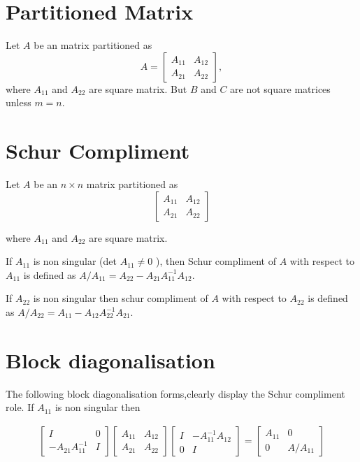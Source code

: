 
\section{Partitioned Matrix}
\begin{definition}
Let $A$ be an  matrix partitioned as 
$$ A = 
 \begin{bmatrix}
 A_{11} & A_{12}\\
 A_{21} & A_{22}
 \end{bmatrix},$$
where $A_{11}$ and $A_{22} $ are square matrix. But $B$ and $C$ are not square matrices unless $m =n$.
\end{definition}


\section{Schur Compliment}
Let $A$ be an $n\times n$ matrix partitioned as  
\[
 \begin{bmatrix}
 A_{11} & A_{12}\\
 A_{21} & A_{22}
 \end{bmatrix}
\]

where $A_{11}$ and $A_{22} $ are square matrix. 

If $A_{11}$ is non singular (det $A_{11}\neq 0 $ ), then Schur compliment of $A$ with respect to $A_{11}$
is defined as $A / A_{11} =  A_{22}-A_{21}A^{-1}_{11}A_{12}$.


If $A_{22}$ is non singular then schur compliment of $A$ with respect to
$A_{22}$ is defined as $ A / A_{22} =  A_{11}-A_{12}A^{-1}_{22}A_{21}$.\\


\section{Block diagonalisation}
The following block diagonalisation forms,clearly display the Schur compliment  role.
If $A_{11}$ is non singular then

\begin{eqnarray}
\begin{bmatrix}I&0\\-A_{21}A_{11}^{-1}&I\end{bmatrix}
\begin{bmatrix}A_{11}&A_{12}\\ A_{21}&A_{22}\end{bmatrix} 
\begin{bmatrix}I&-A_{11}^{-1}A_{12}\\0&I\end{bmatrix}
=
\begin{bmatrix}A_{11}&0\\0&A/A_{11}\end{bmatrix}
\end{eqnarray}

